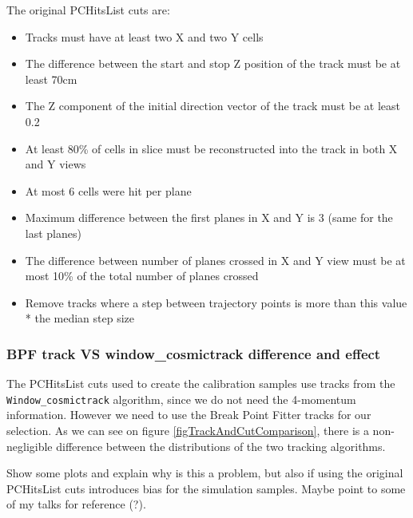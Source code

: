 \documentclass[12pt]{article}
\begin{document}
The original PCHitsList cuts are:
\begin{itemize}
\item Tracks must have at least two X and two Y cells
\item The difference between the start and stop Z position of the track must be at least 70cm
\item The Z component of the initial direction vector of the track must be at least 0.2
\item At least 80\% of cells in slice must be reconstructed into the track in both X and Y views
\item At most 6 cells were hit per plane
\item Maximum difference between the first planes in X and Y is 3 (same for the last planes)
\item The difference between number of planes crossed in X and Y view must be at most 10\% of the total number of planes crossed
\item Remove tracks where a step between trajectory points is more than this value * the median step size
\end{itemize}

\subsubsection*{BPF track VS window\_cosmictrack difference and effect}\label{secBPFvsWindowTrack}

The PCHitsList cuts used to create the calibration samples use tracks from the \texttt{Window\_cosmictrack} algorithm, since we do not need the 4-momentum information. However we need to use the Break Point Fitter tracks for our selection. As we can see on figure \ref{figTrackAndCutComparison}, there is a non-negligible difference between the distributions of the two tracking algorithms. 

Show some plots and explain why is this a problem, but also if using the original PCHitsList cuts introduces bias for the simulation samples. Maybe point to some of my talks for reference (?).
\end{document}
